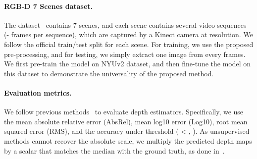 \documentclass{article}
\begin{document}
\begin{table}[!t]
\centering
    \caption{Single-view depth estimation results on 7 Scenes~\cite{shotton2013scene}.
    The model is pre-trained on NYUv2~\cite{silberman2012indoor}, and on each scene, we fine-tune models for three epochs. 
    As the training data is limited, the fine-tuning consumes less than  minutes.
    }
    \label{tab:7-scene}
\end{table}


\paragraph{RGB-D 7 Scenes dataset.}
The dataset~\cite{shotton2013scene} contains 7 scenes, 
and each scene contains several video sequences (- frames per sequence), 
which are captured by a Kinect camera at  resolution.
We follow the official train/test split for each scene.
For training, we use the proposed pre-processing,
and for testing, we simply extract one image from every  frames. We first pre-train the model on NYUv2 dataset, and then fine-tune the model on this dataset to demonstrate the universality of the proposed method.

\paragraph{Evaluation metrics.}
We follow previous methods~\cite{liu2016learning,laina2016deeper,fu2018deep, Yin2019enforcing} to evaluate depth estimators.
Specifically, we use the mean absolute relative error (AbsRel),
mean log10 error (Log10), root mean squared error (RMS),
and the accuracy under threshold ( < 
, ).
As unsupervised methods cannot recover the absolute scale, we multiply the predicted depth maps by a scalar that matches the median with the ground truth,
as done in~\cite{zhou2017unsupervised,bian2019depth,monodepth2}.
\end{document}
